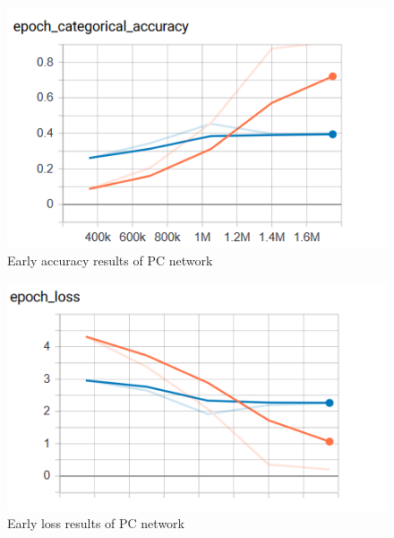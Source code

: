 \begin{figure}[!ht]
    \centering
    \includegraphics[scale=0.60]{images/PC_early_accuracy.png}
    \caption{Early accuracy results of PC network}
    \label{fig:early_PC_acc}
\end{figure}
\begin{figure}[!ht]
    \centering
    \includegraphics[scale=0.60]{images/PC_early_loss.png}
    \caption{Early loss results of PC network}
    \label{fig:early_PC_loss}
\end{figure}

